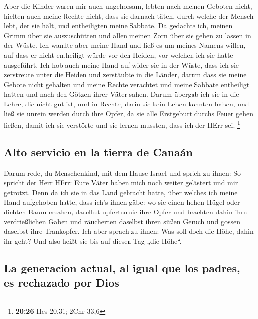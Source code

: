  Aber die Kinder waren mir auch ungehorsam, lebten nach
meinen Geboten nicht, hielten auch meine Rechte nicht, dass sie darnach
täten, durch welche der Mensch lebt, der sie hält, und entheiligten
meine Sabbate. Da gedachte ich, meinen Grimm über sie auszuschütten und
allen meinen Zorn über sie gehen zu lassen in der Wüste. 
Ich wandte aber meine Hand und ließ es um meines Namens willen, auf dass
er nicht entheiligt würde vor den Heiden, vor welchen ich sie hatte
ausgeführt.  Ich hob auch meine Hand auf wider sie in der
Wüste, dass ich sie zerstreute unter die Heiden und zerstäubte in die
Länder,  darum dass sie meine Gebote nicht gehalten und
meine Rechte verachtet und meine Sabbate entheiligt hatten und nach den
Götzen ihrer Väter sahen.  Darum übergab ich sie in die
Lehre, die nicht gut ist, und in Rechte, darin sie kein Leben konnten
haben,  und ließ sie unrein werden durch ihre Opfer, da
sie alle Erstgeburt durchs Feuer gehen ließen, damit ich sie verstörte
und sie lernen mussten, dass ich der HErr sei. \footnote{\textbf{20:26}
  Hes 20,31; 2Chr 33,6}

\hypertarget{alto-servicio-en-la-tierra-de-canauxe1n}{%
\subsection{Alto servicio en la tierra de
Canaán}\label{alto-servicio-en-la-tierra-de-canauxe1n}}

 Darum rede, du Menschenkind, mit dem Hause Israel und
sprich zu ihnen: So spricht der Herr HErr: Eure Väter haben mich noch
weiter gelästert und mir getrotzt.  Denn da ich sie in
das Land gebracht hatte, über welches ich meine Hand aufgehoben hatte,
dass ich's ihnen gäbe: wo sie einen hohen Hügel oder dichten Baum
ersahen, daselbst opferten sie ihre Opfer und brachten dahin ihre
verdrießlichen Gaben und räucherten daselbst ihren süßen Geruch und
gossen daselbst ihre Trankopfer.  Ich aber sprach zu
ihnen: Was soll doch die Höhe, dahin ihr geht? Und also heißt sie bis
auf diesen Tag „die Höhe``.

\hypertarget{la-generacion-actual-al-igual-que-los-padres-es-rechazado-por-dios}{%
\subsection{La generacion actual, al igual que los padres, es rechazado
por
Dios}\label{la-generacion-actual-al-igual-que-los-padres-es-rechazado-por-dios}}

